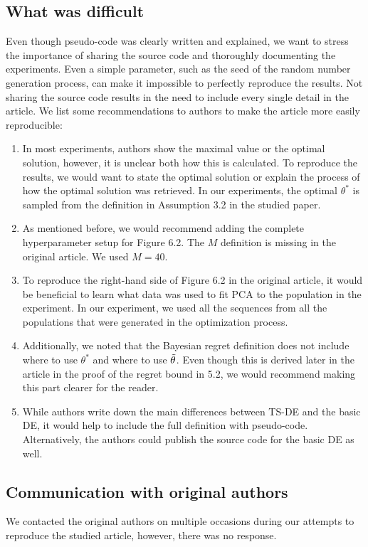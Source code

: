 \subsection{What was difficult}
Even though pseudo-code was clearly written and explained, we want to stress the importance of sharing the source code and thoroughly documenting the experiments. Even a simple parameter, such as the seed of the random number generation process, can make it impossible to perfectly reproduce the results. Not sharing the source code results in the need to include every single detail in the article. We list some recommendations to authors to make the article more easily reproducible:
\begin{enumerate}
    \item In most experiments, authors show the maximal value or the optimal solution, however, it is unclear both how this is calculated. To reproduce the results, we would want to state the optimal solution or explain the process of how the optimal solution was retrieved. In our experiments, the optimal $\theta^*$ is sampled from the definition in Assumption 3.2 in the studied paper.
    \item As mentioned before, we would recommend adding the complete hyperparameter setup for Figure 6.2. The $M$ definition is missing in the original article. We used $M=40$.
    \item To reproduce the right-hand side of Figure 6.2 in the original article, it would be beneficial to learn what data was used to fit PCA to the population in the experiment. In our experiment, we used all the sequences from all the populations that were generated in the optimization process.
    \item Additionally, we noted that the Bayesian regret definition does not include where to use $\theta^*$ and where to use $\Tilde{\theta}$. Even though this is derived later in the article in the proof of the regret bound in 5.2, we would recommend making this part clearer for the reader.
    \item While authors write down the main differences between TS-DE and the basic DE, it would help to include the full definition with pseudo-code. Alternatively, the authors could publish the source code for the basic DE as well.  
\end{enumerate}

\subsection{Communication with original authors}
We contacted the original authors on multiple occasions during our attempts to reproduce the studied article, however, there was no response. 
